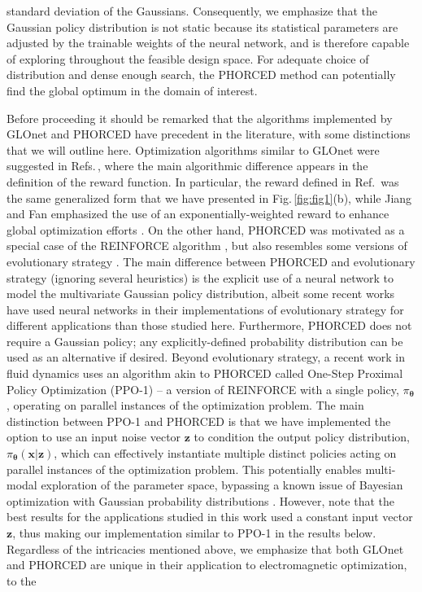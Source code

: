 \documentclass{article}
\begin{document}
standard deviation of the Gaussians. Consequently, we emphasize that the Gaussian policy distribution is not static because its statistical parameters are adjusted by the trainable weights of the neural network, and is therefore capable of exploring throughout the feasible design space. For adequate choice of distribution and dense enough search, the PHORCED method can potentially find the global optimum in the domain of interest. %

Before proceeding it should be remarked that the algorithms implemented by GLOnet and PHORCED have precedent in the literature, with some distinctions that we will outline here. Optimization algorithms similar to GLOnet were suggested in Refs.\,\cite{faury_neural_2018, faury_improving_2019}, where the main algorithmic difference appears in the definition of the reward function. In particular, the reward defined in Ref.\,\cite{faury_neural_2018} was the same generalized form that we have presented in Fig.\,\ref{fig:fig1}(b), while Jiang and Fan emphasized the use of an exponentially-weighted reward to enhance global optimization efforts \cite{jiang_simulator-based_2020}. On the other hand, PHORCED was motivated as a special case of the REINFORCE algorithm \cite{williams_simple_1992, sutton_policy_2000}, but also resembles some versions of evolutionary strategy \cite{hansen_cma_2016, salimans_evolution_2017, faury_neural_2018, faury_improving_2019}. The main difference between PHORCED and evolutionary strategy (ignoring several heuristics) is the explicit use of a neural network to model the multivariate Gaussian policy distribution, albeit some recent works have used neural networks in their implementations of evolutionary strategy \cite{salimans_evolution_2017,faury_improving_2019} for different applications than those studied here. Furthermore, PHORCED does not require a Gaussian policy; any explicitly-defined probability distribution can be used as an alternative if desired. Beyond evolutionary strategy, a recent work in fluid dynamics \cite{ghraieb_single-step_2021} uses an algorithm akin to PHORCED called One-Step Proximal Policy Optimization (PPO-1) -- a version of REINFORCE with a single policy, $\pi_{\boldsymbol{\theta}}$, operating on parallel instances of the optimization problem. The main distinction between PPO-1 and PHORCED is that we have implemented the option to use an input noise vector $\mathbf{z}$ to condition the output policy distribution, $\pi_{\boldsymbol{\theta}}(\mathbf{x}|\mathbf{z})$, which can effectively instantiate multiple distinct policies acting on parallel instances of the optimization problem. This potentially enables multi-modal exploration of the parameter space, bypassing a known issue of Bayesian optimization with Gaussian probability distributions \cite{faury_improving_2019}. However, note that the best results for the applications studied in this work used a constant input vector $\mathbf{z}$, thus making our implementation similar to PPO-1 in the results below. Regardless of the intricacies mentioned above, we emphasize that both GLOnet and PHORCED are unique in their application to electromagnetic optimization, to the 
\end{document}
